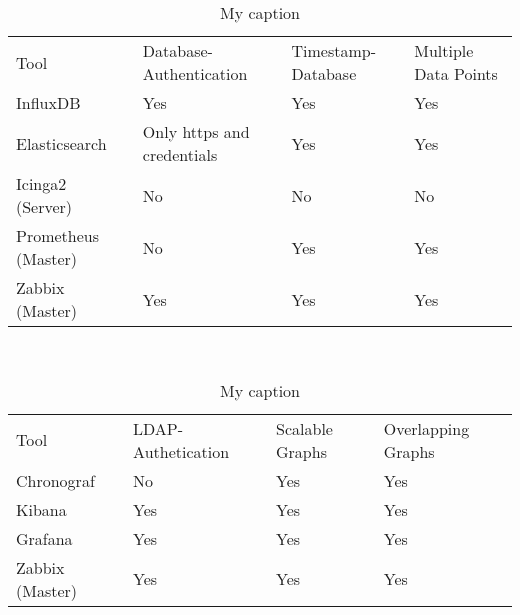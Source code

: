 \begin{table}[]
\centering
\caption{My caption}
\label{my-label}
\begin{tabular}{llll}
\cellcolor[HTML]{FFFFFF}Tool & Database-Authentication     & Timestamp-Database          & Multiple Data Points        \\
InfluxDB                     & \cellcolor[HTML]{FFFFFF}Yes & Yes                         & Yes                         \\
Elasticsearch                & Only https and credentials  & \cellcolor[HTML]{FFFFFF}Yes & Yes                         \\
Icinga2 (Server)             & No                          & No                          & No                          \\
Prometheus (Master)          & No                          & \cellcolor[HTML]{FFFFFF}Yes & Yes                         \\
Zabbix (Master)              & Yes                         & Yes                         & \cellcolor[HTML]{FFFFFF}Yes
\end{tabular}
\end{table}

\\

\begin{table}[]
\centering
\caption{My caption}
\label{my-label}
\begin{tabular}{llll}
\cellcolor[HTML]{FFFFFF}Tool & LDAP-Authetication         & Scalable Graphs             & Overlapping Graphs          \\
Chronograf                   & \cellcolor[HTML]{FFFFFF}No & Yes                         & Yes                         \\
Kibana                       & Yes                        & \cellcolor[HTML]{FFFFFF}Yes & Yes                         \\
Grafana                      & Yes                        & \cellcolor[HTML]{FFFFFF}Yes & Yes                         \\
Zabbix (Master)              & Yes                        & Yes                         & \cellcolor[HTML]{FFFFFF}Yes
\end{tabular}
\end{table}

